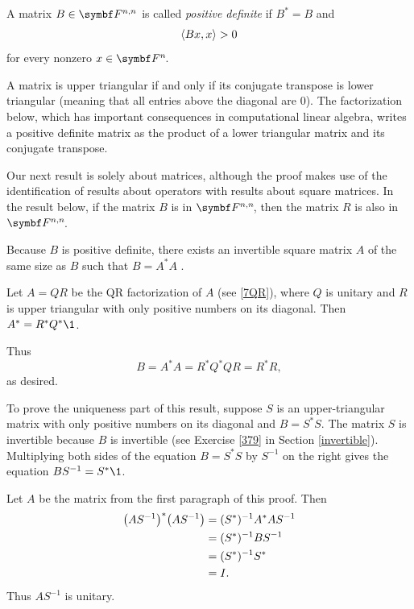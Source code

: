 {A matrix $B \in \F{n, n}$ is called \emph{positive definite} if $B^* = B$ and
\[
\ip{Bx, x} > 0
\]
for every nonzero $x \in \FF n$.}

A matrix is upper triangular if and only if its conjugate transpose is lower triangular (meaning that all entries above the diagonal are $0$). The factorization below, which has important consequences in computational linear algebra, writes a positive definite matrix as the product of a lower triangular matrix and its conjugate transpose.

Our next result is solely about matrices, although the proof makes use of the identification of results about operators with results about square matrices. In the result below, if the matrix $B$ is in $\F{n,n}\!$, then the matrix $R$ is also in $\F{n,n}\!$.


\proof
Because $B$ is positive definite, there exists an invertible square matrix $A$ of the same size as $B$ such that $B = A^* A$ .

Let $A = QR$ be the QR factorization of $A$ (see \ref{7QR}), where $Q$ is unitary and $R$ is upper triangular with only positive numbers on its diagonal. Then $A^* = R^*Q^*\1$.


Thus
\[
B = A^* A = R^* Q^* Q R = R^* R,
\]
as desired.

To prove the uniqueness part of this result, suppose $S$ is an upper-triangular matrix with only positive numbers on its diagonal and $B = S^*S$. The matrix $S$ is invertible because $B$ is invertible (see Exercise \ref{379} in Section \ref{invertible}). Multiplying both sides of the equation $B = S^*S$ by $S^{-1}$ on the right gives the equation $BS^{-1} = S^*\1$.

Let $A$ be the matrix from the first paragraph of this proof. Then
\begin{align*}
\paren[\big]{AS^{-1}}^* \paren[\big]{AS^{-1}} &= \paren{S^*}^{-1} A^* A S^{-1} \\
&= \paren{S^*}^{-1} B S^{-1} \\
&= \paren{S^*}^{-1} S^* \\
&= I.
\end{align*}
Thus $AS^{-1}$ is unitary.

